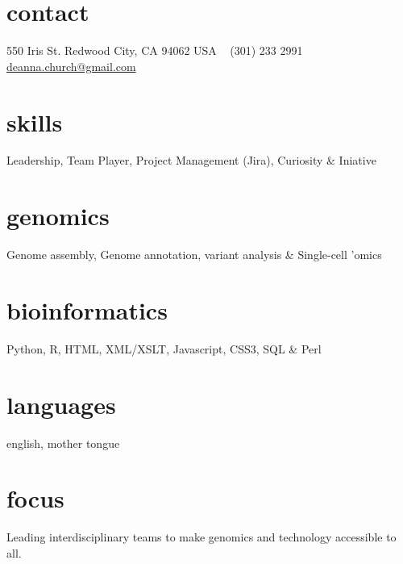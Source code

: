\documentclass[]{dmc-cv} %
\begin{document}


\begin{aside} %
\section{contact}
550 Iris St.
Redwood City, CA 94062
USA
~
(301) 233 2991
~
\href{mailto:deanna.church@gmail.com}{deanna.church@gmail.com}
\section{skills}
Leadership, Team Player,
Project Management (Jira),
Curiosity \& Iniative
\section{genomics}
Genome assembly,
Genome annotation,
variant analysis \&
Single-cell 'omics
\section{bioinformatics}
Python, R,
HTML, XML/XSLT, Javascript,
CSS3, SQL \& Perl
\section{languages}
english, mother tongue
\end{aside}

\section{focus}
Leading interdisciplinary teams to make genomics and technology accessible to all.

\end{document}
